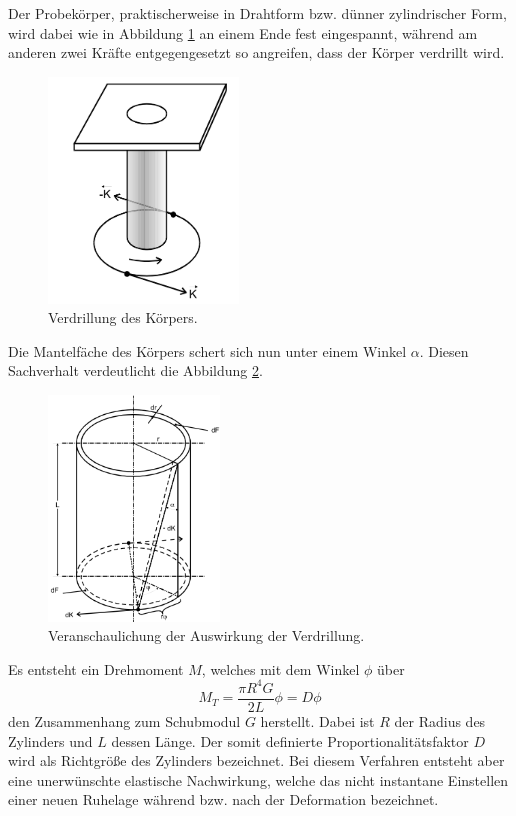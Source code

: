 Der Probekörper, praktischerweise in Drahtform bzw. dünner zylindrischer Form, wird dabei wie in Abbildung \ref{fig:2} an einem Ende fest eingespannt, während am anderen zwei Kräfte entgegengesetzt so angreifen, dass der Körper verdrillt wird.
\begin{figure}[H]
  \centering
  \includegraphics[height=6cm]{scherung2.png}
  \caption{Verdrillung des Körpers. \cite{sample}}
  \label{fig:2}
\end{figure}
Die Mantelfäche des Körpers schert sich nun unter einem Winkel $\alpha$. Diesen Sachverhalt verdeutlicht die Abbildung \ref{fig:3}.
\begin{figure}[H]
  \centering
  \includegraphics[height=6cm]{scherung3.png}
  \caption{Veranschaulichung der Auswirkung der Verdrillung. \cite{sample}}
  \label{fig:3}
\end{figure}
Es entsteht ein Drehmoment $M$, welches mit dem Winkel $\phi$ über
\begin{equation}
  M_T = \frac{\pi R^4 G}{2L} \phi = D \phi \label{eqn:4}
\end{equation}
den Zusammenhang zum Schubmodul $G$ herstellt.
Dabei ist $R$ der Radius des Zylinders und $L$ dessen Länge.
Der somit definierte Proportionalitätsfaktor $D$ wird als Richtgröße des Zylinders bezeichnet.
Bei diesem Verfahren entsteht aber eine unerwünschte elastische Nachwirkung, welche das nicht instantane Einstellen einer neuen Ruhelage während bzw. nach der Deformation bezeichnet.
